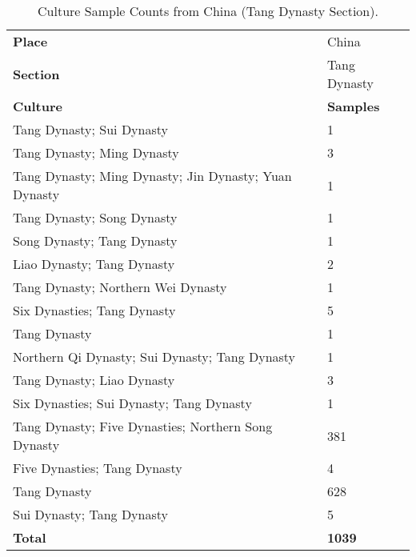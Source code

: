 \documentclass[11pt]{article}
\begin{document}
\begin{table}[ht!]
    \centering
    \small
    \begin{tabularx}{\columnwidth}{Xl}
        \hline
        \rowcolor{brown!30} \textbf{Place} & China \\
        \rowcolor{brown!20} \textbf{Section} & Tang Dynasty \\
        \hline
        \rowcolor{brown!10} \textbf{Culture} & \textbf{Samples} \\
        \hline
        Tang Dynasty; Sui Dynasty & 1 \\
        Tang Dynasty; Ming Dynasty & 3 \\
        Tang Dynasty; Ming Dynasty; Jin Dynasty; Yuan Dynasty & 1 \\
        Tang Dynasty; Song Dynasty & 1 \\
        Song Dynasty; Tang Dynasty & 1 \\
        Liao Dynasty; Tang Dynasty & 2 \\
        Tang Dynasty; Northern Wei Dynasty & 1 \\
        Six Dynasties; Tang Dynasty & 5 \\
        Tang Dynasty & 1 \\
        Northern Qi Dynasty; Sui Dynasty; Tang Dynasty & 1 \\
        Tang Dynasty; Liao Dynasty & 3 \\
        Six Dynasties; Sui Dynasty; Tang Dynasty & 1 \\
        Tang Dynasty; Five Dynasties; Northern Song Dynasty & 381 \\
        Five Dynasties; Tang Dynasty & 4 \\
        Tang Dynasty & 628 \\
        Sui Dynasty; Tang Dynasty & 5 \\
        \hline
        \rowcolor{brown!10}\textbf{Total} & \textbf{1039} \\
        \hline
    \end{tabularx}
    \caption{Culture Sample Counts from China (Tang Dynasty Section).}
    \label{tab:culture-sample-tang}
\end{table}
\end{document}
